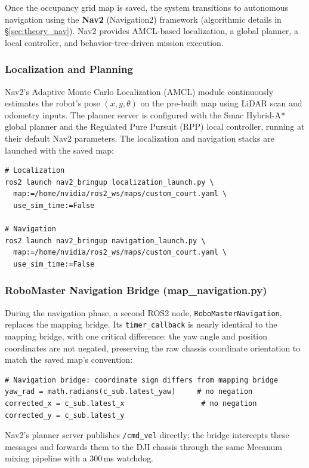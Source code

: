 Once the occupancy grid map is saved, the system transitions to autonomous navigation using the \textbf{Nav2} (Navigation2) framework (algorithmic details in \S\ref{sec:theory_nav}). Nav2 provides AMCL-based localization, a global planner, a local controller, and behavior-tree-driven mission execution.

\subsubsection{Localization and Planning}

Nav2's Adaptive Monte Carlo Localization (AMCL) module continuously estimates the robot's pose $(x, y, \theta)$ on the pre-built map using LiDAR scan and odometry inputs. The planner server is configured with the Smac Hybrid-A* global planner and the Regulated Pure Pursuit (RPP) local controller, running at their default Nav2 parameters. The localization and navigation stacks are launched with the saved map:

\begin{verbatim}
# Localization
ros2 launch nav2_bringup localization_launch.py \
  map:=/home/nvidia/ros2_ws/maps/custom_court.yaml \
  use_sim_time:=False

# Navigation
ros2 launch nav2_bringup navigation_launch.py \
  map:=/home/nvidia/ros2_ws/maps/custom_court.yaml \
  use_sim_time:=False
\end{verbatim}

\subsubsection{RoboMaster Navigation Bridge (map\_navigation.py)}

During the navigation phase, a second ROS2 node, \texttt{RoboMasterNavigation}, replaces the mapping bridge. Its \texttt{timer\_callback} is nearly identical to the mapping bridge, with one critical difference: the yaw angle and position coordinates are not negated, preserving the raw chassis coordinate orientation to match the saved map's convention:

\begin{verbatim}
# Navigation bridge: coordinate sign differs from mapping bridge
yaw_rad = math.radians(c_sub.latest_yaw)     # no negation
corrected_x = c_sub.latest_x                  # no negation
corrected_y = c_sub.latest_y
\end{verbatim}

Nav2's planner server publishes \texttt{/cmd\_vel} directly; the bridge intercepts these messages and forwards them to the DJI chassis through the same Mecanum mixing pipeline with a 300\,ms watchdog.

